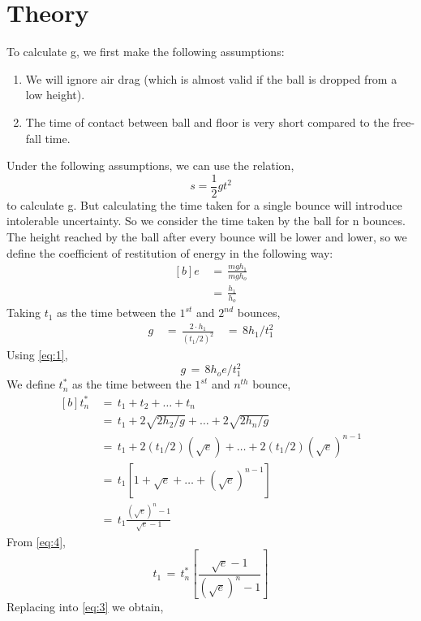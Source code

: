\documentclass{article}
\begin{document}
\begin{sloppypar}
\section{Theory}
To calculate g, we first make the following assumptions:
\begin{enumerate}
    \item We will ignore air drag (which is almost valid if the ball is dropped from a low height).
    \item The time of contact between ball and floor is very short compared to the free-fall time.
\end{enumerate}
Under the following assumptions, we can use the relation, \[s = \frac{1}{2}gt^2\] to calculate g. But calculating the time taken for a single bounce will introduce intolerable uncertainty. So we consider the time taken by the ball for n bounces.
The height reached by the ball after every bounce will be lower and lower, so we define the coefficient of restitution of energy in the following way:
\begin{equation} 
	\begin{aligned}[b]
	e & \, = \, \frac{mgh_1}{mgh_o} \\
	  & \, = \, \frac{h_1}{h_o} \label{eq:1}
	\end{aligned}
\end{equation}
Taking $t_1$ as the time between the $1^{st}$ and $2^{nd}$ bounces,
\begin{equation} \label{eq:2}
    \begin{aligned}
        g & \, = \, \frac{2 \cdot h_1}{(t_1 / 2)^2} 
          & \, = \, 8 h_1 / t^2_1
    \end{aligned}
\end{equation}
Using \ref{eq:1},
\begin{equation} \label{eq:3}
    g \, = \, 8 h_o e / t^2_1 
\end{equation}
We define $t^*_n$ as the time between the $1^{st}$ and $n^{th}$ bounce,
\begin{equation}
    \begin{aligned}[b]
        t^*_n & \, = \, t_1 + t_2 + \ldots + t_n \\
              & \, = \, t_1 + 2\sqrt{2 h_2 / g} + \ldots + 2\sqrt{2 h_n / g} \\
              & \, = \, t_1 + 2(t_1/2)(\sqrt{e}) + \ldots + 2(t_1/2)(\sqrt{e})^{n - 1} \\
              & \, = \, t_1[1 + \sqrt{e} + \ldots + (\sqrt{e})^{n - 1}] \\
              & \, = \, t_1\frac{(\sqrt{e})^n - 1}{\sqrt{e} - 1} \label{eq:4}
    \end{aligned}
\end{equation}
From \ref{eq:4},
\begin{equation}
         t_1 \,= \, t^*_n \left[\frac{\sqrt{e} - 1} {(\sqrt{e})^n - 1}\right]
\end{equation}
Replacing into \ref{eq:3} we obtain, 


\end{sloppypar}
\end{document}
